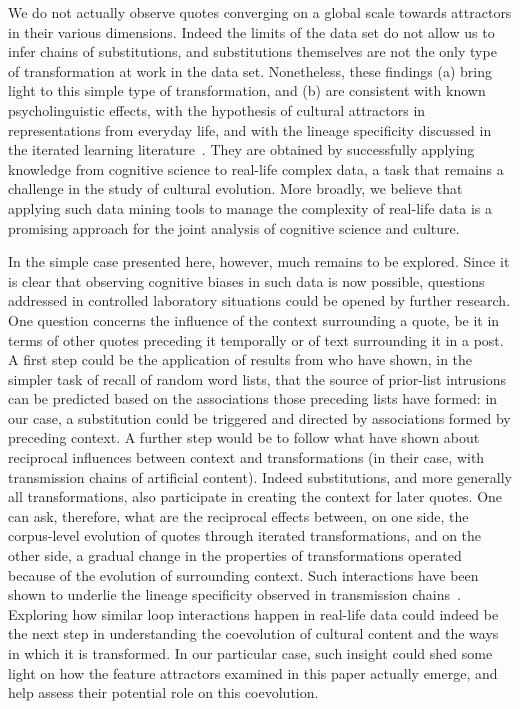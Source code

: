 \begin{new}
We do not actually observe quotes converging on a global scale towards attractors in their various dimensions.
Indeed the limits of the data set do not allow us to infer chains of substitutions, and substitutions themselves are not the only type of transformation at work in the data set.
Nonetheless, these findings (a) bring light to this simple type of transformation, and (b) are consistent with known psycholinguistic effects, with the hypothesis of cultural attractors in representations from everyday life, and with the lineage specificity discussed in the iterated learning literature~\citep{claidiere_cultural_2014,cornish_systems_2013}.
They are obtained by successfully applying knowledge from cognitive science to real-life complex data, a task that remains a challenge in the study of cultural evolution.
More broadly, we believe that applying such data mining tools to manage the complexity of real-life data is a promising approach for the joint analysis of cognitive science and culture.

In the simple case presented here, however, much remains to be explored.
Since it is clear that observing cognitive biases in such data is now possible, questions addressed in controlled laboratory situations could be opened by further research.
One question concerns the influence of the context surrounding a quote, be it in terms of other quotes preceding it temporally or of text surrounding it in a post.
A first step could be the application of results from \citet{zaromb_temporal_2006} who have shown, in the simpler task of recall of random word lists, that the source of prior-list intrusions can be predicted based on the associations those preceding lists have formed:
in our case, a substitution could be triggered and directed by associations formed by preceding context.
A further step would be to follow what \citet{cornish_systems_2013} have shown about reciprocal influences between context and transformations (in their case, with transmission chains of artificial content).
Indeed substitutions, and more generally all transformations, also participate in creating the context for later quotes.
One can ask, therefore, what are the reciprocal effects between, on one side, the corpus-level evolution of quotes through iterated transformations, and on the other side, a gradual change in the properties of transformations operated because of the evolution of surrounding context.
Such interactions have been shown to underlie the lineage specificity observed in transmission chains~\citep{claidiere_cultural_2014}.
Exploring how similar loop interactions happen in real-life data could indeed be the next step in understanding the coevolution of cultural content and the ways in which it is transformed.
In our particular case, such insight could shed some light on how the feature attractors examined in this paper actually emerge, and help assess their potential role on this coevolution.

\end{new}

